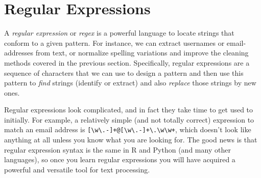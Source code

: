 %

\section{Regular Expressions}
\label{sec:regular}

A \emph{regular expression} or \emph{regex} is a powerful language to locate strings that conform to a given pattern. For instance, we can extract usernames or email-addresses from text, or normalize spelling variations and improve the cleaning methods covered in the previous section. Specifically, regular expressions are a sequence of characters that we can use to design a pattern and then use this pattern to \emph{find} strings (identify or extract) and also \emph{replace} those strings by new ones.

Regular expressions look complicated, and in fact they take time to get used to initially.
For example, a relatively simple (and not totally correct) expression to match an email address is \verb|[\w\.-]+@[\w\.-]+\.\w\w+|,
which doesn't look like anything at all unless you know what you are looking for.
The good news is that regular expression syntax is the same in R and Python (and many other languages),
so once you learn regular expressions you will have acquired a powerful and versatile tool for text processing.



